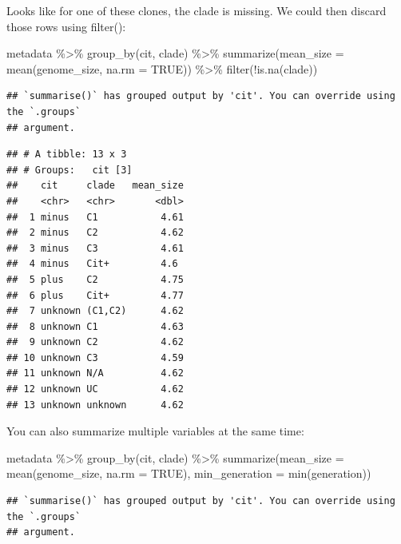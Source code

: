 \documentclass[
]{book}
\newenvironment{Shaded}{\begin{snugshade}}{\end{snugshade}}
\newcommand{\AttributeTok}[1]{\textcolor[rgb]{0.77,0.63,0.00}{#1}}
\newcommand{\ConstantTok}[1]{\textcolor[rgb]{0.00,0.00,0.00}{#1}}
\newcommand{\FunctionTok}[1]{\textcolor[rgb]{0.00,0.00,0.00}{#1}}
\newcommand{\NormalTok}[1]{#1}
\newcommand{\SpecialCharTok}[1]{\textcolor[rgb]{0.00,0.00,0.00}{#1}}
\begin{document}
Looks like for one of these clones, the clade is missing. We could then discard those rows using filter():

\begin{Shaded}
\begin{Highlighting}[]
\NormalTok{metadata }\SpecialCharTok{\%\textgreater{}\%}
  \FunctionTok{group\_by}\NormalTok{(cit, clade) }\SpecialCharTok{\%\textgreater{}\%}
  \FunctionTok{summarize}\NormalTok{(}\AttributeTok{mean\_size =} \FunctionTok{mean}\NormalTok{(genome\_size, }\AttributeTok{na.rm =} \ConstantTok{TRUE}\NormalTok{)) }\SpecialCharTok{\%\textgreater{}\%}
  \FunctionTok{filter}\NormalTok{(}\SpecialCharTok{!}\FunctionTok{is.na}\NormalTok{(clade))}
\end{Highlighting}
\end{Shaded}

\begin{verbatim}
## `summarise()` has grouped output by 'cit'. You can override using the `.groups`
## argument.
\end{verbatim}

\begin{verbatim}
## # A tibble: 13 x 3
## # Groups:   cit [3]
##    cit     clade   mean_size
##    <chr>   <chr>       <dbl>
##  1 minus   C1           4.61
##  2 minus   C2           4.62
##  3 minus   C3           4.61
##  4 minus   Cit+         4.6 
##  5 plus    C2           4.75
##  6 plus    Cit+         4.77
##  7 unknown (C1,C2)      4.62
##  8 unknown C1           4.63
##  9 unknown C2           4.62
## 10 unknown C3           4.59
## 11 unknown N/A          4.62
## 12 unknown UC           4.62
## 13 unknown unknown      4.62
\end{verbatim}

You can also summarize multiple variables at the same time:

\begin{Shaded}
\begin{Highlighting}[]
\NormalTok{metadata }\SpecialCharTok{\%\textgreater{}\%}
  \FunctionTok{group\_by}\NormalTok{(cit, clade) }\SpecialCharTok{\%\textgreater{}\%}
  \FunctionTok{summarize}\NormalTok{(}\AttributeTok{mean\_size =} \FunctionTok{mean}\NormalTok{(genome\_size, }\AttributeTok{na.rm =} \ConstantTok{TRUE}\NormalTok{),}
            \AttributeTok{min\_generation =} \FunctionTok{min}\NormalTok{(generation))}
\end{Highlighting}
\end{Shaded}

\begin{verbatim}
## `summarise()` has grouped output by 'cit'. You can override using the `.groups`
## argument.
\end{verbatim}
\end{document}
